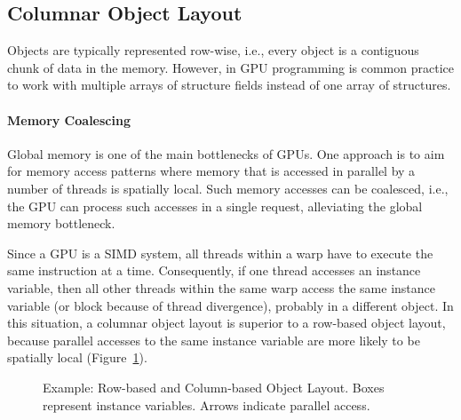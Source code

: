 \documentclass[preprint]{sigplanconf}
\begin{document}
\subsection{Columnar Object Layout}
Objects are typically represented row-wise, i.e., every object is a contiguous chunk of data in the memory. However, in GPU programming is common practice to work with multiple arrays of structure fields instead of one array of structures.

\paragraph{Memory Coalescing}
Global memory is one of the main bottlenecks of GPUs. One approach is to aim for memory access patterns where memory that is accessed in parallel by a number of threads is spatially local. Such memory accesses can be coalesced, i.e., the GPU can process such accesses in a single request, alleviating the global memory bottleneck.

Since a GPU is a SIMD system, all threads within a warp have to execute the same instruction at a time. Consequently, if one thread accesses an instance variable, then all other threads within the same warp access the same instance variable (or block because of thread divergence), probably in a different object. In this situation, a columnar object layout is superior to a row-based object layout, because parallel accesses to the same instance variable are more likely to be spatially local (Figure~\ref{fig:ex_obj_layout}).

\begin{figure}[!htp]
    \centering
    
    \caption{Example: Row-based and Column-based Object Layout. Boxes represent instance variables. Arrows indicate parallel access.}
    \label{fig:ex_obj_layout}%
\end{figure}
\end{document}
